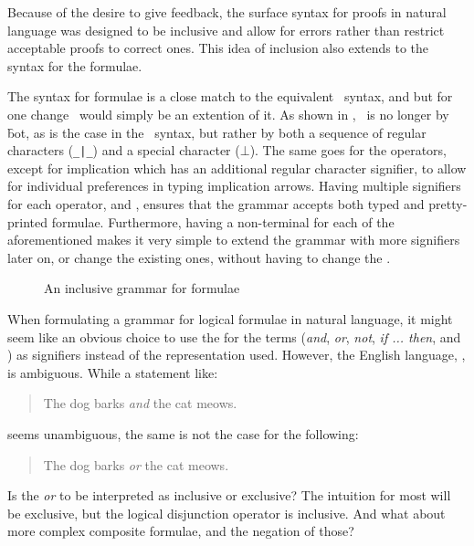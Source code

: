 \documentclass[BA.tex]{subfiles}
\begin{document}
Because of the desire to give feedback, the surface syntax for proofs in
natural language was designed to be inclusive and allow for errors rather
than restrict acceptable proofs to correct ones. This idea of inclusion
also extends to the syntax for the formulae.

The  syntax for formulae is a close match to the equivalent
 \bp\ syntax, and but for one change \ours\ would simply be an extention
 of it. As shown in , \abs\ is no longer  by
 \f{bot}, as is the case in the \bp\ syntax, but rather by both a sequence 
 of regular characters (\verb+_|_+) and a special character (\(\bot\)). 
 The same goes for the operators, except for implication which has an
 additional regular character signifier, to allow for individual preferences
 in typing implication arrows. Having multiple signifiers for each
 operator, and , ensures that the grammar
 accepts both typed and pretty-printed formulae. Furthermore, having a
 non-terminal for each of the aforementioned  makes it
 very simple to extend the grammar with more signifiers later on, or change
 the existing ones, without having to change the 
 .

\begin{figure}[!hb]

\caption{An inclusive grammar for formulae}
\label{nlform}
\end{figure}

When formulating a grammar for logical formulae in natural language, it
 might seem like an obvious choice to use the 
 for the  terms
 (\emph{and}, \emph{or}, \emph{not}, \emph{if ... then},  and \emph{\abs})
 as signifiers instead of the  representation used. However, 
 the English language, , is
 ambiguous. While a statement like:
 \begin{quote}
    The dog barks \emph{and} the cat meows.
 \end{quote}
 seems unambiguous, the same is not the case for the following:
 \begin{quote}
    The dog barks \emph{or} the cat meows.
 \end{quote}
 Is the \emph{or} to be interpreted as inclusive or exclusive? 
 The intuition for most will be exclusive, but the logical disjunction
 operator is inclusive. And what about more complex composite formulae,
 and the negation of those? 
 
\end{document}

